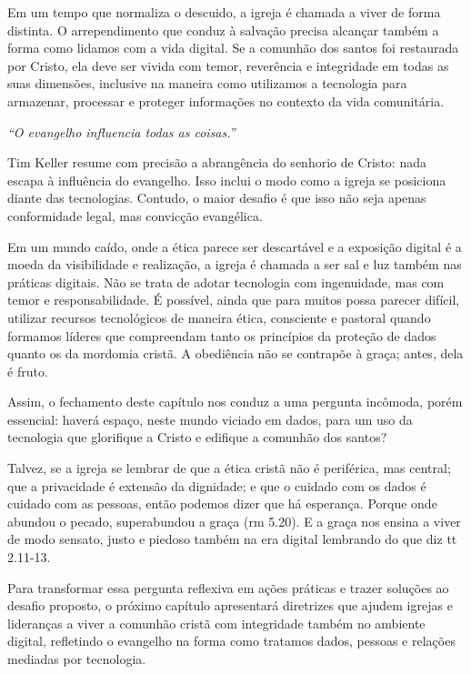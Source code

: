 Em um tempo que normaliza o descuido, a igreja é chamada a viver de forma distinta. O arrependimento que conduz à salvação precisa alcançar também a forma como lidamos com a vida digital. Se a comunhão dos santos foi restaurada por Cristo, ela deve ser vivida com temor, reverência e integridade em todas as suas dimensões, inclusive na maneira como utilizamos a tecnologia para armazenar, processar e proteger informações no contexto da vida comunitária.

\textit{``O evangelho influencia todas as coisas.''} \cite[p.~56]{keller2014}

Tim Keller resume com precisão a abrangência do senhorio de Cristo: nada escapa à influência do evangelho. Isso inclui o modo como a igreja se posiciona diante das tecnologias. Contudo, o maior desafio é que isso não seja apenas conformidade legal, mas convicção evangélica.

Em um mundo caído, onde a ética parece ser descartável e a exposição digital é a moeda da visibilidade e realização, a igreja é chamada a ser sal e luz também nas práticas digitais. Não se trata de adotar tecnologia com ingenuidade, mas com temor e responsabilidade. É possível, ainda que para muitos possa parecer difícil, utilizar recursos tecnológicos de maneira ética, consciente e pastoral quando formamos líderes que compreendam tanto os princípios da proteção de dados quanto os da mordomia cristã. A obediência não se contrapõe à graça; antes, dela é fruto.

Assim, o fechamento deste capítulo nos conduz a uma pergunta incômoda, porém essencial: haverá espaço, neste mundo viciado em dados, para um uso da tecnologia que glorifique a Cristo e edifique a comunhão dos santos?

Talvez, se a igreja se lembrar de que a ética cristã não é periférica, mas central; que a privacidade é extensão da dignidade; e que o cuidado com os dados é cuidado com as pessoas,  então podemos dizer que há esperança. Porque onde abundou o pecado, superabundou a graça (\gls{rm} 5.20). E a graça nos ensina a viver de modo sensato, justo e piedoso também na era digital lembrando do que diz \gls{tt} 2.11-13.

Para transformar essa pergunta reflexiva em ações práticas e trazer soluções ao desafio proposto, o próximo capítulo apresentará diretrizes que ajudem igrejas e lideranças a viver a comunhão cristã com integridade também no ambiente digital, refletindo o evangelho na forma como tratamos dados, pessoas e relações mediadas por tecnologia.